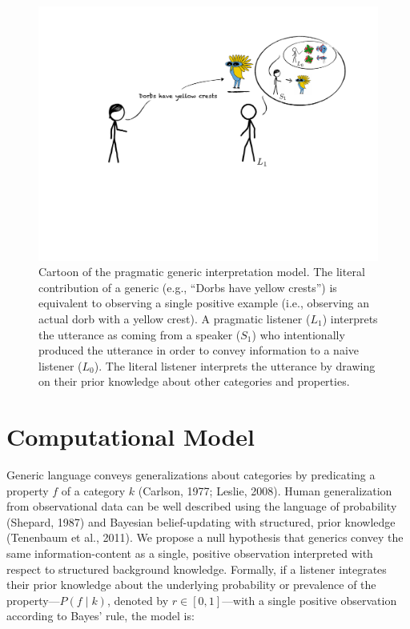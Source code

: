\documentclass[floatsintext,doc]{apa6}
\begin{document}
\begin{figure}
\centering
\includegraphics{figs/cartoon.pdf}
\caption{\label{fig:cartoon}Cartoon of the pragmatic generic interpretation model. The literal contribution of a generic (e.g., \enquote{Dorbs have yellow crests}) is equivalent to observing a single positive example (i.e., observing an actual dorb with a yellow crest). A pragmatic listener (\(L_1\)) interprets the utterance as coming from a speaker (\(S_1\)) who intentionally produced the utterance in order to convey information to a naive listener (\(L_0\)). The literal listener interprets the utterance by drawing on their prior knowledge about other categories and properties.}
\end{figure}

\hypertarget{computational-model}{%
\section{Computational Model}\label{computational-model}}

Generic language conveys generalizations about categories by predicating a property $f$ of a category $k$ (Carlson, 1977; Leslie, 2008).
Human generalization from observational data can be well described using the language of probability (Shepard, 1987) and Bayesian belief-updating with structured, prior knowledge (Tenenbaum et al., 2011).
We propose a null hypothesis that generics convey the same information-content as a single, positive observation interpreted with respect to structured background knowledge.
Formally, if a listener integrates their prior knowledge about the underlying probability or prevalence of the property---$P(f \mid k)$, denoted by \(r \in [0, 1]\)---with a single positive observation according to Bayes' rule, the model is:
\end{document}
